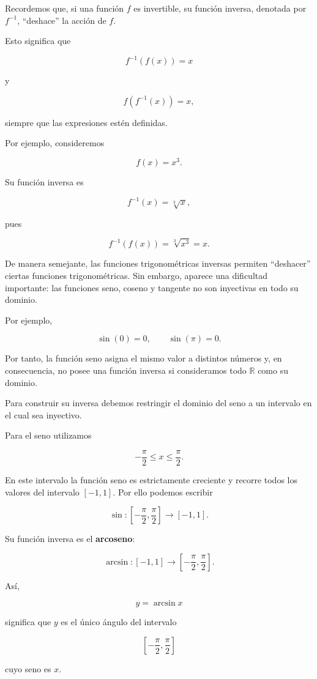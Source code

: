 \documentclass[12pt]{article}
\theoremstyle{definition}
\theoremstyle{remark}
\begin{document}
Recordemos que, si una función $f$ es invertible, su función inversa,
denotada por $f^{-1}$, ``deshace'' la acción de $f$.

Esto significa que

\[
f^{-1}(f(x))=x
\]

y

\[
f(f^{-1}(x))=x,
\]

siempre que las expresiones estén definidas.

Por ejemplo, consideremos

\[
f(x)=x^3.
\]

Su función inversa es

\[
f^{-1}(x)=\sqrt[3]{x},
\]

pues

\[
f^{-1}(f(x))
=
\sqrt[3]{x^3}
=
x.
\]

De manera semejante, las funciones trigonométricas inversas permiten
``deshacer'' ciertas funciones trigonométricas. Sin embargo, aparece una
dificultad importante: las funciones seno, coseno y tangente no son
inyectivas en todo su dominio.

Por ejemplo,

\[
\sin(0)=0,
\qquad
\sin(\pi)=0.
\]

Por tanto, la función seno asigna el mismo valor a distintos números y,
en consecuencia, no posee una función inversa si consideramos todo
$\mathbb{R}$ como su dominio.

Para construir su inversa debemos restringir el dominio del seno a un
intervalo en el cual sea inyectivo.

Para el seno utilizamos

\[
-\frac{\pi}{2}\leq x\leq\frac{\pi}{2}.
\]

En este intervalo la función seno es estrictamente creciente y recorre
todos los valores del intervalo $[-1,1]$. Por ello podemos escribir

\[
\sin:
\left[-\frac{\pi}{2},\frac{\pi}{2}\right]
\longrightarrow [-1,1].
\]

Su función inversa es el \textbf{arcoseno}:

\[
\arcsin:
[-1,1]
\longrightarrow
\left[-\frac{\pi}{2},\frac{\pi}{2}\right].
\]

Así,

\[
y=\arcsin x
\]

significa que $y$ es el único ángulo del intervalo

\[
\left[-\frac{\pi}{2},\frac{\pi}{2}\right]
\]

cuyo seno es $x$.
\end{document}

